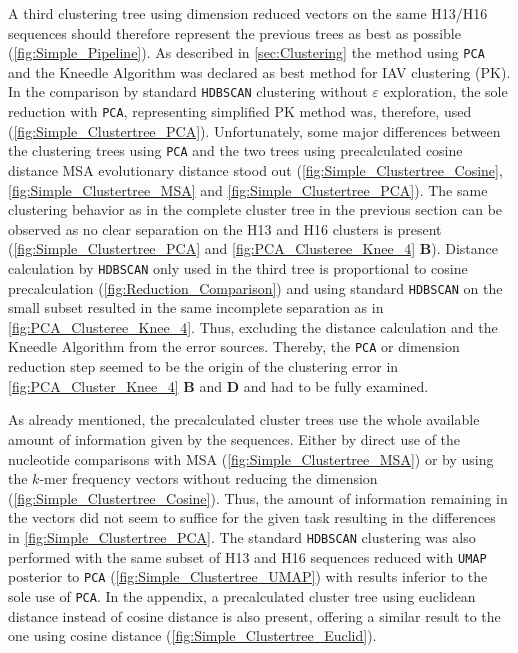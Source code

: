 A third clustering tree using dimension reduced vectors on the same H13/H16 sequences should therefore represent the previous trees as best as possible (\autoref{fig:Simple_Pipeline}). As described in \autoref{sec:Clustering} the method using \texttt{PCA} and the Kneedle Algorithm was declared as best method for \gls{IAV} clustering (PK). In the comparison by standard \texttt{HDBSCAN} clustering without $\varepsilon$ exploration, the sole reduction with \texttt{PCA}, representing simplified PK method was, therefore, used (\autoref{fig:Simple_Clustertree_PCA}). Unfortunately, some major differences between the clustering trees using \texttt{PCA} and the two trees using precalculated cosine distance \gls{MSA} evolutionary distance stood out (\autoref{fig:Simple_Clustertree_Cosine}, \autoref{fig:Simple_Clustertree_MSA} and \autoref{fig:Simple_Clustertree_PCA}). The same clustering behavior as in the complete cluster tree in the previous section can be observed as no clear separation on the H13 and H16 clusters is present (\autoref{fig:Simple_Clustertree_PCA} and \autoref{fig:PCA_Clusteree_Knee_4} \textbf{\textsf{B}}). Distance calculation by \texttt{HDBSCAN} only used in the third tree is proportional to cosine precalculation (\autoref{fig:Reduction_Comparison}) and using standard \texttt{HDBSCAN} on the small subset resulted in the same incomplete separation as in \autoref{fig:PCA_Clusteree_Knee_4}. Thus, excluding the distance calculation and the Kneedle Algorithm from the error sources. Thereby, the \texttt{PCA} or dimension reduction step seemed to be the origin of the clustering error in \autoref{fig:PCA_Cluster_Knee_4} \textbf{\textsf{B}} and \textbf{\textsf{D}} and had to be fully examined.

\vspace{1em}

As already mentioned, the precalculated cluster trees use the whole available amount of information given by the sequences. Either by direct use of the nucleotide comparisons with \gls{MSA} (\autoref{fig:Simple_Clustertree_MSA}) or by using the $k$-mer frequency vectors without reducing the dimension (\autoref{fig:Simple_Clustertree_Cosine}). Thus, the amount of information remaining in the vectors did not seem to suffice for the given task resulting in the differences in \autoref{fig:Simple_Clustertree_PCA}. The standard \texttt{HDBSCAN} clustering was also performed with the same subset of H13 and H16 sequences reduced with \texttt{UMAP} posterior to \texttt{PCA} (\autoref{fig:Simple_Clustertree_UMAP}) with results inferior to the sole use of \texttt{PCA}. In the appendix, a precalculated cluster tree using euclidean distance instead of cosine distance is also present, offering a similar result to the one using cosine distance (\autoref{fig:Simple_Clustertree_Euclid}).